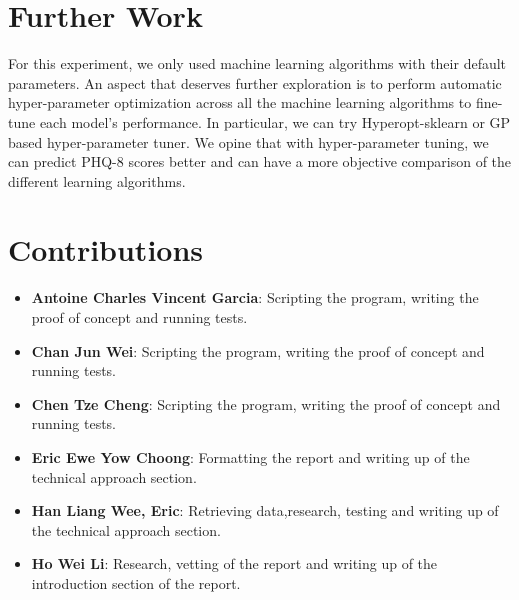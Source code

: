 \documentclass{article}
\begin{document}
	\section{Further Work}
	For this experiment, we only used machine learning algorithms with their default parameters. 
	An aspect that deserves further exploration is to perform automatic hyper-parameter optimization
	across all the machine learning algorithms to fine-tune each model's performance. 
	In particular, we can try Hyperopt-sklearn \cite{Komer2014HyperoptsklearnAH} or GP based hyper-parameter tuner. 
	We opine that with hyper-parameter tuning, we can predict PHQ-8 scores better and can have a more objective comparison of the different learning algorithms.
	
	\section{Contributions}
	\begin{itemize}
		\item \textbf{Antoine Charles Vincent Garcia}: 
		Scripting the program, writing the proof of concept and running tests.
		\item \textbf{Chan Jun Wei}: 
		Scripting the program, writing the proof of concept and running tests.
		\item \textbf{Chen Tze Cheng}: 
		Scripting the program, writing the proof of concept and running tests.
		\item \textbf{Eric Ewe Yow Choong}: 
		Formatting the report and writing up of the technical approach section.
		\item \textbf{Han Liang Wee, Eric}: 
		Retrieving data,research, testing and writing up of the technical approach section.
		\item \textbf{Ho Wei Li}: 
		Research, vetting of the report and writing up of the introduction section of the report.
	\end{itemize}
	
	
	{\scriptsize }
\end{document}
